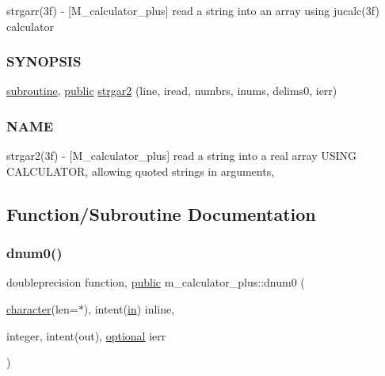 \begin{DoxyCompactItemize}
\begin{DoxyCompactList}
strgarr(3f) -\/ \mbox{[}M\+\_\+calculator\+\_\+plus\mbox{]} read a string into an array using jucalc(3f) calculator \subsubsection*{S\+Y\+N\+O\+P\+S\+IS}\end{DoxyCompactList}\item 
\hyperlink{M__stopwatch_83_8txt_acfbcff50169d691ff02d4a123ed70482}{subroutine}, \hyperlink{M__stopwatch_83_8txt_a2f74811300c361e53b430611a7d1769f}{public} \hyperlink{namespacem__calculator__plus_a59710eb6babeed1f4b8d439f97d5d90a}{strgar2} (line, iread, numbrs, inums, delims0, ierr)
\begin{DoxyCompactList}\small\item\em \subsubsection*{N\+A\+ME}

strgar2(3f) -\/ \mbox{[}M\+\_\+calculator\+\_\+plus\mbox{]} read a string into a real array U\+S\+I\+NG C\+A\+L\+C\+U\+L\+A\+T\+OR, allowing quoted strings in arguments, \end{DoxyCompactList}\end{DoxyCompactItemize}


\subsection{Function/\+Subroutine Documentation}
\mbox{\label{namespacem__calculator__plus_add45c0bb36bc796ee8a0354665f9397e}} 
\subsubsection{\texorpdfstring{dnum0()}{dnum0()}}
{\footnotesize\ttfamily doubleprecision function, \hyperlink{M__stopwatch_83_8txt_a2f74811300c361e53b430611a7d1769f}{public} m\+\_\+calculator\+\_\+plus\+::dnum0 (\begin{DoxyParamCaption}\item[{\hyperlink{option__stopwatch_83_8txt_abd4b21fbbd175834027b5224bfe97e66}{character}(len=$\ast$), intent(\hyperlink{M__journal_83_8txt_afce72651d1eed785a2132bee863b2f38}{in})}]{inline,  }\item[{integer, intent(out), \hyperlink{option__stopwatch_83_8txt_aa4ece75e7acf58a4843f70fe18c3ade5}{optional}}]{ierr }\end{DoxyParamCaption})}



